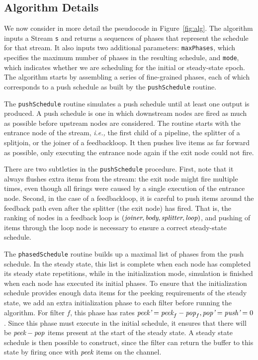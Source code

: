 \subsection{Algorithm Details}

We now consider in more detail the pseudocode in Figure~\ref{fig:alg}.
The algorithm inputs a Stream {\tt s} and returns a sequences of
phases that represent the schedule for that stream.  It also inputs
two additional parameters: {\tt maxPhases}, which specifies the
maximum number of phases in the resulting schedule, and {\tt mode},
which indicates whether we are scheduling for the initial or
steady-state epoch.  The algorithm starts by assembling a series of
fine-grained phases, each of which corresponds to a push schedule as
built by the {\tt pushSchedule} routine.

The {\tt pushSchedule} routine simulates a push schedule until at
least one output is produced.  A push schedule is one in which
downstream nodes are fired as much as possible before upstream nodes
are considered.  The routine starts with the entrance node of the
stream, {\it i.e.,} the first child of a pipeline, the splitter of a
splitjoin, or the joiner of a feedbackloop.  It then pushes live items
as far forward as possible, only executing the entrance node again if
the exit node could not fire.  

There are two subtleties in the {\tt pushSchedule} procedure.  First,
note that it always flushes extra items from the stream: the exit node
might fire multiple times, even though all firings were caused by a
single execution of the entrance node.  Second, in the case of a
feedbackloop, it is careful to push items around the feedback path
even after the splitter (the exit node) has fired.  That is, the
ranking of nodes in a feedback loop is $(\mbox{\it joiner}, \mbox{\it body},
\mbox{\it splitter}, \mbox{\it loop})$, and pushing of items through the loop node
is necessary to ensure a correct steady-state schedule.

The {\tt phasedSchedule} routine builds up a maximal list of phases
from the push schedule.  In the steady state, this list is complete
when each node has completed its steady state repetitions, while in
the initialization mode, simulation is finished when each node has
executed its initial phases.  To ensure that the initialization
schedule provides enough data items for the peeking requirements of
the steady state, we add an extra initialization phase to each filter
before running the algorithm.  For filter $f$, this phase has rates
$\mbox{\it peek'}=\mbox{\it peek}_f - \mbox{\it pop}_f, \mbox{\it pop'}=\mbox{\it push'}=0$.  Since
this phase must execute in the initial schedule, it ensures that there
will be $\mbox{\it peek}-\mbox{\it pop}$ items present at the start of the steady
state.  A steady state schedule is then possible to construct, since
the filter can return the buffer to this state by firing once with
$\mbox{\it peek}$ items on the channel.

